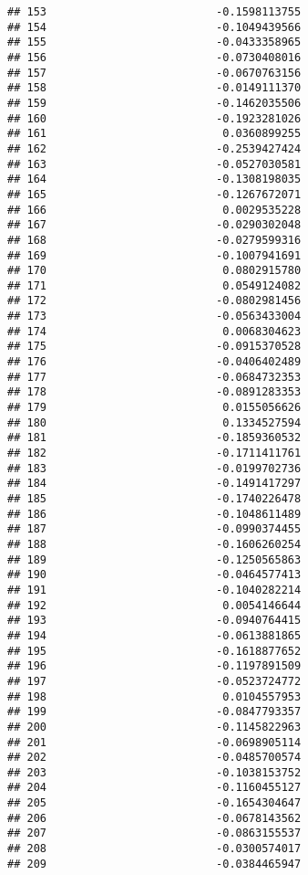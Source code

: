 \documentclass[
]{article}
\begin{document}
\begin{verbatim}
## 153                          -0.1598113755
## 154                          -0.1049439566
## 155                          -0.0433358965
## 156                          -0.0730408016
## 157                          -0.0670763156
## 158                          -0.0149111370
## 159                          -0.1462035506
## 160                          -0.1923281026
## 161                           0.0360899255
## 162                          -0.2539427424
## 163                          -0.0527030581
## 164                          -0.1308198035
## 165                          -0.1267672071
## 166                           0.0029535228
## 167                          -0.0290302048
## 168                          -0.0279599316
## 169                          -0.1007941691
## 170                           0.0802915780
## 171                           0.0549124082
## 172                          -0.0802981456
## 173                          -0.0563433004
## 174                           0.0068304623
## 175                          -0.0915370528
## 176                          -0.0406402489
## 177                          -0.0684732353
## 178                          -0.0891283353
## 179                           0.0155056626
## 180                           0.1334527594
## 181                          -0.1859360532
## 182                          -0.1711411761
## 183                          -0.0199702736
## 184                          -0.1491417297
## 185                          -0.1740226478
## 186                          -0.1048611489
## 187                          -0.0990374455
## 188                          -0.1606260254
## 189                          -0.1250565863
## 190                          -0.0464577413
## 191                          -0.1040282214
## 192                           0.0054146644
## 193                          -0.0940764415
## 194                          -0.0613881865
## 195                          -0.1618877652
## 196                          -0.1197891509
## 197                          -0.0523724772
## 198                           0.0104557953
## 199                          -0.0847793357
## 200                          -0.1145822963
## 201                          -0.0698905114
## 202                          -0.0485700574
## 203                          -0.1038153752
## 204                          -0.1160455127
## 205                          -0.1654304647
## 206                          -0.0678143562
## 207                          -0.0863155537
## 208                          -0.0300574017
## 209                          -0.0384465947

\end{verbatim}
\end{document}
